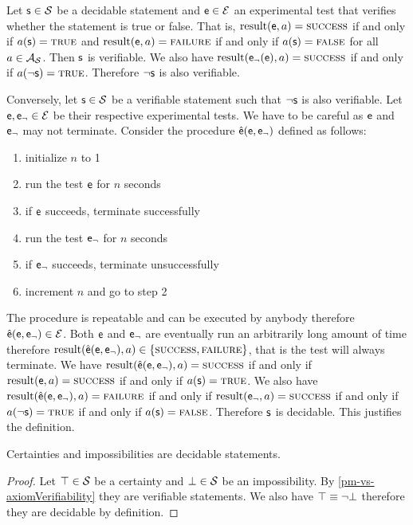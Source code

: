 \begin{mathSection}
\begin{justification}
			Let $\mathsf{s} \in \mathcal{S}$ be a decidable statement and $\mathsf{e} \in \mathcal{E}$ an experimental test that verifies whether the statement is true or false. That is, $\operatorname{result}(\mathsf{e}, a) = \textsc{success}$ if and only if $a(\mathsf{s}) = \textup{\textsc{true}}$ and $\operatorname{result}(\mathsf{e}, a) = \textsc{failure}$ if and only if $a(\mathsf{s}) = \textup{\textsc{false}}$ for all $a \in \mathcal{A}_{\mathcal{S}}$. Then $\mathsf{s}$ is verifiable. We also have $\operatorname{result}(\mathsf{e}_\neg(\mathsf{e}), a) = \textsc{success}$ if and only if $a(\neg\mathsf{s}) = \textup{\textsc{true}}$. Therefore $\neg\mathsf{s}$ is also verifiable.
			
			Conversely, let $\mathsf{s} \in \mathcal{S}$ be a verifiable statement such that $\neg\mathsf{s}$ is also verifiable. Let $\mathsf{e}, \mathsf{e}_\neg \in \mathcal{E}$ be their respective experimental tests. We have to be careful as $\mathsf{e}$ and $\mathsf{e}_\neg$ may not terminate. Consider the procedure $\hat{\mathsf{e}}(\mathsf{e}, \mathsf{e}_\neg)$ defined as follows:
			\begin{enumerate}
				\item initialize $n$ to 1
				\item run the test $\mathsf{e}$ for $n$ seconds
				\item if $\mathsf{e}$ succeeds, terminate successfully
				\item run the test $\mathsf{e}_\neg$ for $n$ seconds
				\item if $\mathsf{e}_\neg$ succeeds, terminate unsuccessfully
				\item increment $n$ and go to step 2
			\end{enumerate}
			The procedure is repeatable and can be executed by anybody therefore $\hat{\mathsf{e}}(\mathsf{e}, \mathsf{e}_\neg) \in \mathcal{E}$. Both $\mathsf{e}$ and $\mathsf{e}_\neg$ are eventually run an arbitrarily long amount of time therefore $\operatorname{result}(\hat{\mathsf{e}}(\mathsf{e}, \mathsf{e}_\neg), a) \in \{\textsc{success}, \textsc{failure} \}$, that is the test will always terminate. We have $\operatorname{result}(\hat{\mathsf{e}}(\mathsf{e}, \mathsf{e}_\neg), a) = \textsc{success} $ if and only if $\operatorname{result}(\mathsf{e}, a) = \textsc{success}$ if and only if $a(\mathsf{s}) = \textup{\textsc{true}}$. We also have $\operatorname{result}(\hat{\mathsf{e}}(\mathsf{e}, \mathsf{e}_\neg), a) = \textsc{failure}$ if and only if $\operatorname{result}(\mathsf{e}_\neg, a) = \textsc{success}$ if and only if $a(\neg\mathsf{s}) = \textup{\textsc{true}}$ if and only if $a(\mathsf{s}) = \textup{\textsc{false}}$. Therefore $\mathsf{s}$ is decidable. This justifies the definition.
		\end{justification}
		
		\begin{coro}
			Certainties and impossibilities are decidable statements.
		\end{coro}
		\begin{proof}
			Let $\top \in \mathcal{S}$ be a certainty and $\bot \in \mathcal{S}$ be an impossibility. By \ref{pm-vs-axiomVerifiability} they are verifiable statements. We also have $\top \equiv \neg \bot$ therefore they are decidable by definition.
		\end{proof}
		
	\end{mathSection}
	

